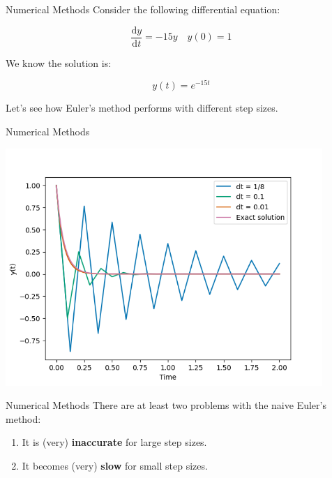 \documentclass{beamer}
\begin{document}
\begin{frame}{Numerical Methods}
    Consider the following differential equation:

    \vspace{0.5cm}

    \begin{equation}
        \frac{\mathrm{d}y}{\mathrm{d}t} = -15y \quad y(0) = 1
    \end{equation}

    \vspace{0.5cm}

    We know the solution is:

    \vspace{0.5cm}

    \begin{equation}
        y(t) = e^{-15t}
    \end{equation}

    \vspace{0.5cm}

    Let's see how Euler's method performs with different step sizes.
\end{frame}


\begin{frame}{Numerical Methods}
    \begin{center}
        \includegraphics[width=0.9\textwidth]{asset/euler_method.png}
    \end{center}
\end{frame}


\begin{frame}{Numerical Methods}
    There are at least two problems with the naive Euler's method:

    \vspace{0.5cm}

    \begin{enumerate}
        \item It is (very) \textbf{inaccurate} for large step sizes.
        \item It becomes (very) \textbf{slow} for small step sizes.
    \end{enumerate}
\end{frame}
\end{document}
